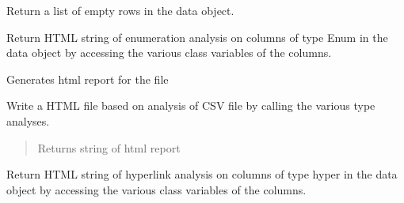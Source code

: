 \documentclass[letterpaper,10pt,english]{sphinxmanual}
\begin{document}
\begin{fulllineitems}
\begin{fulllineitems}
\label{Code_rst/rep:report.Report.empty_columns}
Return a list of empty rows in the data object.

\end{fulllineitems}


\begin{fulllineitems}
\label{Code_rst/rep:report.Report.enum_analysis}
Return HTML string of enumeration analysis on columns of type Enum 
in the data object by accessing the various class variables of the
columns.

\end{fulllineitems}


\begin{fulllineitems}
\label{Code_rst/rep:report.Report.gen_html}
Generates html report for the file

\end{fulllineitems}


\begin{fulllineitems}
\label{Code_rst/rep:report.Report.html_report}
Write a HTML file based on analysis of CSV file by calling the various
type analyses.
\begin{quote}

Returns string of html report
\end{quote}

\end{fulllineitems}


\begin{fulllineitems}
\label{Code_rst/rep:report.Report.hyper_analysis}
Return HTML string of hyperlink analysis on columns of type hyper 
in the data object by accessing the various class variables of the
columns.

\end{fulllineitems}



\end{fulllineitems}
\end{document}
